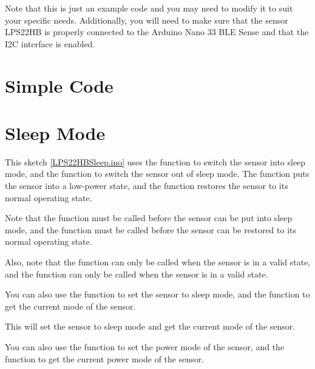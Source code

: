 Note that this is just an example code and you may need to modify it to suit your specific needs. Additionally, you will need to make sure that the sensor LPS22HB is properly connected to the Arduino Nano 33 BLE Sense and that the I2C interface is enabled.

\section{Simple Code}

\section{Sleep Mode}



{
    \label{LPS22HBSleep.ino}
}

\medskip


This sketch \ref{LPS22HBSleep.ino} uses the function  to switch the sensor into sleep mode, and the function  to switch the sensor out of sleep mode. The function  puts the sensor into a low-power state, and the function  restores the sensor to its normal operating state.

Note that the function  must be called before the sensor can be put into sleep mode, and the function  must be called before the sensor can be restored to its normal operating state.

Also, note that the function   can only be called when the sensor is in a valid state, and the function  can only be called when the sensor is in a valid state.

You can also use the function  to set the sensor to sleep mode, and the function  to get the current mode of the sensor.

\medskip



\medskip

This will set the sensor to sleep mode and get the current mode of the sensor.

You can also use the function   to set the power mode of the sensor, and the function  to get the current power mode of the sensor.

